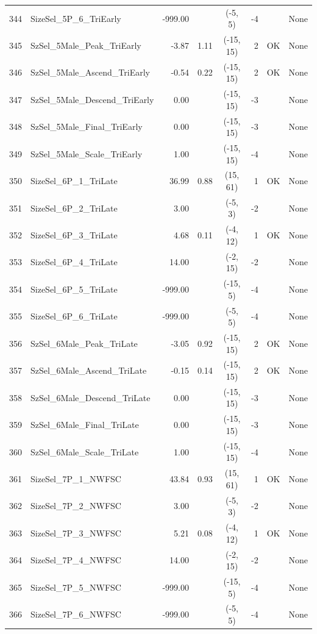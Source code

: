 \documentclass[12pt,]{article}
\begin{document}
\begin{landscape}
\begin{longtable}{rlrrcrcl}
  344 & SizeSel\_5P\_6\_TriEarly & -999.00 &  & (-5, 5) & -4 &  & None \\ 
  345 & SzSel\_5Male\_Peak\_TriEarly & -3.87 & 1.11 & (-15, 15) & 2 & OK & None \\ 
  346 & SzSel\_5Male\_Ascend\_TriEarly & -0.54 & 0.22 & (-15, 15) & 2 & OK & None \\ 
  347 & SzSel\_5Male\_Descend\_TriEarly & 0.00 &  & (-15, 15) & -3 &  & None \\ 
  348 & SzSel\_5Male\_Final\_TriEarly & 0.00 &  & (-15, 15) & -3 &  & None \\ 
  349 & SzSel\_5Male\_Scale\_TriEarly & 1.00 &  & (-15, 15) & -4 &  & None \\ 
  350 & SizeSel\_6P\_1\_TriLate & 36.99 & 0.88 & (15, 61) & 1 & OK & None \\ 
  351 & SizeSel\_6P\_2\_TriLate & 3.00 &  & (-5, 3) & -2 &  & None \\ 
  352 & SizeSel\_6P\_3\_TriLate & 4.68 & 0.11 & (-4, 12) & 1 & OK & None \\ 
  353 & SizeSel\_6P\_4\_TriLate & 14.00 &  & (-2, 15) & -2 &  & None \\ 
  354 & SizeSel\_6P\_5\_TriLate & -999.00 &  & (-15, 5) & -4 &  & None \\ 
  355 & SizeSel\_6P\_6\_TriLate & -999.00 &  & (-5, 5) & -4 &  & None \\ 
  356 & SzSel\_6Male\_Peak\_TriLate & -3.05 & 0.92 & (-15, 15) & 2 & OK & None \\ 
  357 & SzSel\_6Male\_Ascend\_TriLate & -0.15 & 0.14 & (-15, 15) & 2 & OK & None \\ 
  358 & SzSel\_6Male\_Descend\_TriLate & 0.00 &  & (-15, 15) & -3 &  & None \\ 
  359 & SzSel\_6Male\_Final\_TriLate & 0.00 &  & (-15, 15) & -3 &  & None \\ 
  360 & SzSel\_6Male\_Scale\_TriLate & 1.00 &  & (-15, 15) & -4 &  & None \\ 
  361 & SizeSel\_7P\_1\_NWFSC & 43.84 & 0.93 & (15, 61) & 1 & OK & None \\ 
  362 & SizeSel\_7P\_2\_NWFSC & 3.00 &  & (-5, 3) & -2 &  & None \\ 
  363 & SizeSel\_7P\_3\_NWFSC & 5.21 & 0.08 & (-4, 12) & 1 & OK & None \\ 
  364 & SizeSel\_7P\_4\_NWFSC & 14.00 &  & (-2, 15) & -2 &  & None \\ 
  365 & SizeSel\_7P\_5\_NWFSC & -999.00 &  & (-15, 5) & -4 &  & None \\ 
  366 & SizeSel\_7P\_6\_NWFSC & -999.00 &  & (-5, 5) & -4 &  & None \\ 

\end{longtable}
\end{landscape}
\end{document}
